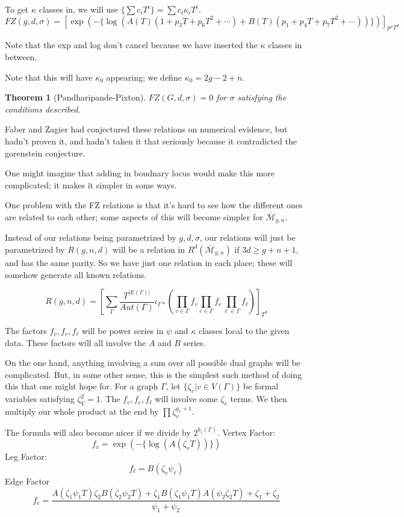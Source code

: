 \documentclass{amsart}
\newtheorem{theorem}{Theorem}
\newcommand{\Mbar}{\overline{\mathcal{M}}}
\newcommand{\Aut}{Aut}
\begin{document}
To get $\kappa$ classes in, we will use $\{\sum c_i T^i\}=\sum c_i\kappa_i T^i$.
$$FZ(g,d,\sigma)=[\exp(-\{\log(A(T)(1+p_3T+p_6T^2+\cdots)+B(T)(p_1+p_4T+p_7T^2+\cdots))\})]_{p^\sigma T^d}$$

Note that the exp and log don't cancel because we have inserted the $\kappa$ classes in between.

Note that this will have $\kappa_0$ appearing; we define $\kappa_0=2g-2+n$.  

\begin{theorem}[Pandharipande-Pixton]
$FZ(G,d,\sigma)=0$ for $\sigma$ satisfying the conditions described.
\end{theorem}
Faber and Zagier had conjectured these relations on numerical evidence, but hadn't proven it, and hadn't taken it that seriously because it contradicted the gorenstein conjecture.


One might imagine that adding in boudnary locus would make this more complicated; it makes it simpler in some ways.

One problem with the FZ relations is that it's hard to see how the different ones are related to each other; some aspects of this will become simpler for $\Mbar_{g,n}$.

Instead of our relations being parametrized by $g,d,\sigma$, our relations will just be parametrized by $R(g,n,d)$ will be a relation in $R^d(\Mbar_{g,n})$ if $3d\geq g+n+1$, and has the same parity.  So we have just one relation in each place; these will somehow generate all known relations.

$$R(g,n,d)=\left[\sum_{\Gamma} \frac{T^{|E(\Gamma)|}}{\Aut(\Gamma)}\iota_{\Gamma*}\left( \prod_{v\in\Gamma} f_v\prod_{e\in\Gamma} f_e \prod_{\ell\in \Gamma} f_\ell\right)\right]_{T^d}$$

The factors $f_v, f_e, f_\ell$ will be power series in $\psi$ and $\kappa$ classes local to the given data.  These factors will all involve the $A$ and $B$ series.  

On the one hand, anything involving a sum over all possible dual graphs will be complicated.  But, in some other sense, this is the simplest such method of doing this that one might hope for.
For a graph $\Gamma$, let $\{\zeta_v|v\in V(\Gamma)\}$ be formal variables satisfying $\zeta_V^2=1$.  The $f_v, f_e, f_\ell$ will involve some $\zeta_v$ terms.  We then multiply our whole product at the end by $\prod\zeta_v^{g_v+1}$.  

The formula will also become nicer if we divide by $2^{b_1(\Gamma)}$.
Vertex Factor:
$$f_v=\exp(-\{\log(A(\zeta_vT))\})$$
Leg Factor:
$$f_\ell=B(\zeta_v\psi_\ell)$$
Edge Factor
$$f_e=\frac{A(\zeta_1\psi_1T)\zeta_2 B(\zeta_2\psi_2T)+\zeta_1B(\zeta_1\psi_1T)A(\psi_2\zeta_2T)+\zeta_1+\zeta_2}{\psi_1+\psi_2}$$
\end{document}
